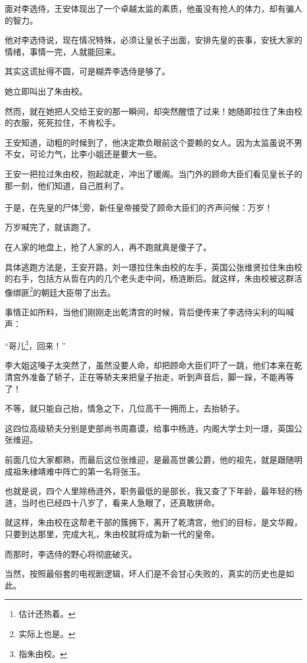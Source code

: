 \begin{multicols}{\theparacolNo}
面对李选侍，王安体现出了一个卓越太监的素质，他虽没有抢人的体力，却有骗人的智力。

他对李选侍说，现在情况特殊，必须让皇长子出面，安排先皇的丧事，安抚大家的情绪，事情一完，人就能回来。

其实这谎扯得不圆，可是糊弄李选侍是够了。

她立即叫出了朱由校。

然而，就在她把人交给王安的那一瞬间，却突然醒悟了过来！她随即拉住了朱由校的衣服，死死拉住，不肯松手。

王安知道，动粗的时候到了，他决定欺负眼前这个耍赖的女人。因为太监虽说不男不女，可论力气，比李小姐还是要大一些。

王安一把拉过朱由校，抱起就走，冲出了暖阁。当门外的顾命大臣们看见皇长子的那一刻，他们知道，自己胜利了。

于是，在先皇的尸体\footnote{估计还热着。}旁，新任皇帝接受了顾命大臣们的齐声问候：万岁！

万岁喊完了，就该跑了。

在人家的地盘上，抢了人家的人，再不跑就真是傻子了。

具体逃跑方法是，王安开路，刘一璟拉住朱由校的左手，英国公张维贤拉住朱由校的右手，包括方从哲在内的几个老头走中间，杨涟断后。就这样，朱由校被这群活像绑匪\footnote{实际上也是。}的朝廷大臣带了出去。

事情正如所料，当他们刚刚走出乾清宫的时候，背后便传来了李选侍尖利的叫喊声：

“哥儿\footnote{指朱由校。}，回来！”

李大姐这嗓子太突然了，虽然没要人命，却把顾命大臣们吓了一跳，他们本来在乾清宫外准备了轿子，正在等轿夫来把皇子抬走，听到声音后，脚一跺，不能再等了！

不等，就只能自己抬，情急之下，几位高干一拥而上，去抬轿子。

这四位高级轿夫分别是吏部尚书周嘉谟，给事中杨涟，内阁大学士刘一璟，英国公张维迎。

前面几位大家都熟，而最后这位张维迎，是最高世袭公爵，他的祖先，就是跟随明成祖朱棣靖难中阵亡的第一名将张玉。

也就是说，四个人里除杨涟外，职务最低的是部长，我又查了下年龄，最年轻的杨涟，当时也已经四十八岁了，看来人急眼了，还真敢拼命。

就这样，朱由校在这帮老干部的簇拥下，离开了乾清宫，他们的目标，是文华殿，只要到达那里，完成大礼，朱由校就将成为新一代的皇帝。

而那时，李选侍的野心将彻底破灭。

当然，按照最俗套的电视剧逻辑，坏人们是不会甘心失败的，真实的历史也是如此。


\end{multicols}
